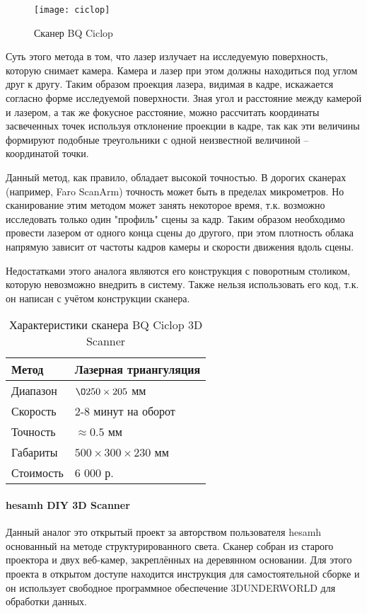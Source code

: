         \begin{figure}[H]
            \centering
            \texttt{[image: ciclop]}\label{pic:ciclop}
            \caption{Сканер BQ Ciclop}
        \end{figure}

        Суть этого метода в том, что лазер излучает на исследуемую поверхность, которую снимает камера. Камера и лазер при этом должны находиться под углом друг к другу. Таким образом проекция лазера, видимая в кадре, искажается согласно форме исследуемой поверхности. Зная угол и расстояние между камерой и лазером, а так же фокусное расстояние, можно рассчитать координаты засвеченных точек используя отклонение проекции в кадре, так как эти величины формируют подобные треугольники с одной неизвестной величиной -- координатой точки.

        Данный метод, как правило, обладает высокой точностью. В дорогих сканерах (например, Faro ScanArm) точность может быть в пределах микрометров. Но сканирование этим методом может занять некоторое время, т.к. возможно исследовать только один "профиль" сцены за кадр. Таким образом необходимо провести лазером от одного конца сцены до другого, при этом плотность облака напрямую зависит от частоты кадров камеры и скорости движения вдоль сцены.

        Недостатками этого аналога являются его конструкция с поворотным столиком, которую невозможно внедрить в систему. Также нельзя использовать его код, т.к. он написан с учётом конструкции сканера.

        \begin{table}[H]
            \centering
            \caption{Характеристики сканера BQ Ciclop 3D Scanner}\label{table:ciclop}
            \begin{tabular}{|l|l|}\hline
            Метод&Лазерная триангуляция\\ \hline
            Диапазон&$\O250 \times 205$ мм\\ \hline
            Скорость&2-8 минут на оборот\\ \hline
            Точность&$\approx 0.5$ мм\\ \hline
            Габариты&$ 500 \times 300 \times 230 $ мм\\ \hline
            Стоимость&6 000 р.\\ \hline
            \end{tabular}
        \end{table}

    \paragraph{hesamh DIY 3D Scanner}
        Данный аналог это открытый проект за авторством пользователя hesamh основанный на методе структурированного света. Сканер собран из старого проектора и двух веб-камер, закреплённых на деревянном основании. Для этого проекта в открытом доступе находится инструкция для самостоятельной сборке и он использует свободное программное обеспечение 3DUNDERWORLD для обработки данных.

